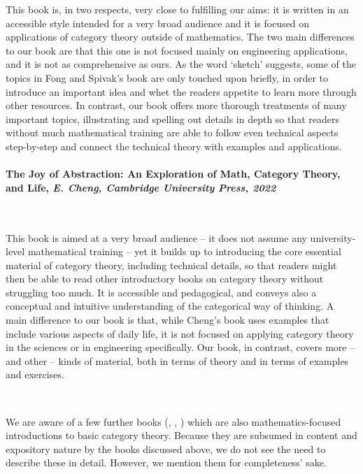 \documentclass[10pt, article, one side]{memoir}
\begin{document}
    This book is, in two respects, very close to fulfilling our aims: it is written in an accessible style intended for a very broad audience and it is focused on applications of category theory outside of mathematics.
    The two main differences to our book are that this one is not focused mainly on engineering applications, and it is not as comprehensive as ours.
    As the word `sketch' suggests, some of the topics in Fong and Spivak's book are only touched upon briefly, in order to introduce an important idea and whet the readers appetite to learn more through other resources.
    In contrast, our book offers more thorough treatments of many important topics, illustrating and spelling out details in depth so that readers without much mathematical training are able to follow even technical aspects step-by-step and connect the technical theory with examples and applications.

    \paragraph{The Joy of Abstraction: An Exploration of Math, Category Theory, and Life, \emph{E.
            Cheng, Cambridge University Press, 2022}~\cite{cheng2022joy}}
    \

    This book is aimed at a very broad audience -- it does not assume any university-level mathematical training -- yet it builds up to introducing the core essential material of category theory, including technical details, so that readers might then be able to read other introductory books on category theory without struggling too much.
    It is accessible and pedagogical, and conveys also a conceptual and intuitive understanding of the categorical way of thinking.
    A main difference to our book is that, while Cheng's book uses examples that include various aspects of daily life, it is not focused on applying category theory in the sciences or in engineering specifically.
    Our book, in contrast, covers more -- and other -- kinds of material, both in terms of theory and in terms of examples and exercises.

    \

    We are aware of a few further books (\cite{Grandis}, \cite{Roman}, \cite{Simmons}) which are also mathematics-focused introductions to basic category theory.
    Because they are subsumed in content and expository nature by the books discussed above, we do not see the need to describe these in detail.
    However, we mention them for completeness' sake.
\end{document}

